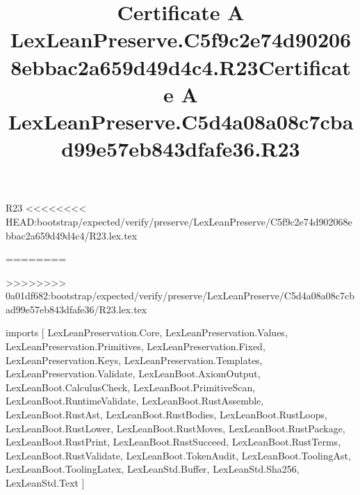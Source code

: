 \begin{lexlean}{R23}
<<<<<<<< HEAD:bootstrap/expected/verify/preserve/LexLeanPreserve/C5f9c2e74d902068ebbac2a659d49d4c4/R23.lex.tex
\title{Certificate A LexLeanPreserve.C5f9c2e74d902068ebbac2a659d49d4c4.R23}
========
\title{Certificate A LexLeanPreserve.C5d4a08a08c7cbad99e57eb843dfafe36.R23}
>>>>>>>> 0a01df682:bootstrap/expected/verify/preserve/LexLeanPreserve/C5d4a08a08c7cbad99e57eb843dfafe36/R23.lex.tex
\begin{coremodule}
imports [
  LexLeanPreservation.Core,
  LexLeanPreservation.Values,
  LexLeanPreservation.Primitives,
  LexLeanPreservation.Fixed,
  LexLeanPreservation.Keys,
  LexLeanPreservation.Templates,
  LexLeanPreservation.Validate,
  LexLeanBoot.AxiomOutput,
  LexLeanBoot.CalculusCheck,
  LexLeanBoot.PrimitiveScan,
  LexLeanBoot.RuntimeValidate,
  LexLeanBoot.RustAssemble,
  LexLeanBoot.RustAst,
  LexLeanBoot.RustBodies,
  LexLeanBoot.RustLoops,
  LexLeanBoot.RustLower,
  LexLeanBoot.RustMoves,
  LexLeanBoot.RustPackage,
  LexLeanBoot.RustPrint,
  LexLeanBoot.RustSucceed,
  LexLeanBoot.RustTerms,
  LexLeanBoot.RustValidate,
  LexLeanBoot.TokenAudit,
  LexLeanBoot.ToolingAst,
  LexLeanBoot.ToolingLatex,
  LexLeanStd.Buffer,
  LexLeanStd.Sha256,
  LexLeanStd.Text
]


\end{coremodule}
\end{lexlean}
